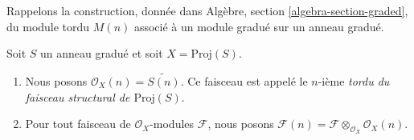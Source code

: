 \noindent
Rappelons la construction, donnée dans Algèbre,
section \ref{algebra-section-graded}, du module tordu $M(n)$ associé à un
module gradué sur un anneau gradué.

\begin{definition}
\label{definition-twist}
Soit $S$ un anneau gradué et soit $X = \text{Proj}(S)$.
\begin{enumerate}
\item Nous posons $\mathcal{O}_X(n) = \widetilde{S(n)}$. Ce faisceau est
appelé le $n$-ième {\it tordu du faisceau structural de $\text{Proj}(S)$}.
\item Pour tout faisceau de
$\mathcal{O}_X$-modules $\mathcal{F}$, nous posons
$\mathcal{F}(n) = \mathcal{F} \otimes_{\mathcal{O}_X} \mathcal{O}_X(n)$.
\end{enumerate}
\end{definition}

